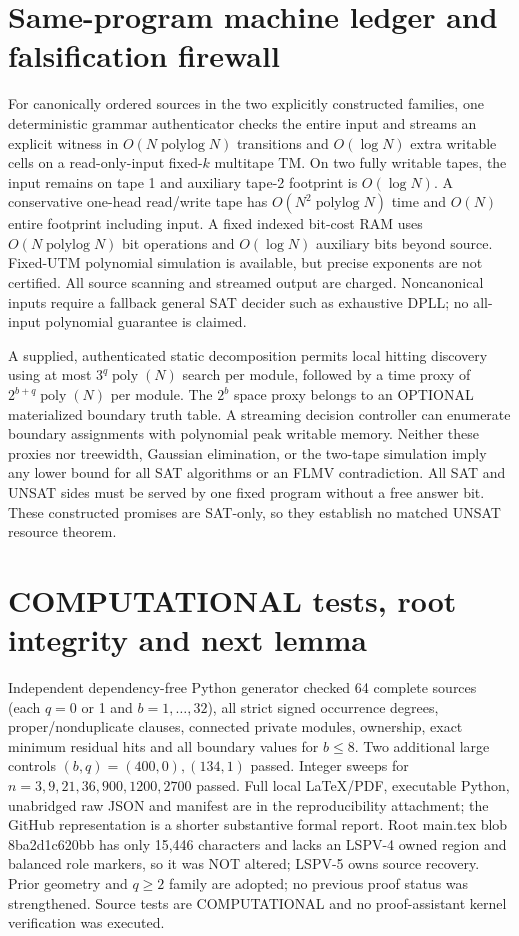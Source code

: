 \documentclass[11pt]{article}
\begin{document}
\section{Same-program machine ledger and falsification firewall}
For canonically ordered sources in the two explicitly constructed families, one deterministic grammar authenticator checks the entire input and streams an explicit witness in $O(N\operatorname{polylog}N)$ transitions and $O(\log N)$ extra writable cells on a read-only-input fixed-$k$ multitape TM. On two fully writable tapes, the input remains on tape 1 and auxiliary tape-2 footprint is $O(\log N)$. A conservative one-head read/write tape has $O(N^2\operatorname{polylog} N)$ time and $O(N)$ entire footprint including input. A fixed indexed bit-cost RAM uses $O(N\operatorname{polylog} N)$ bit operations and $O(\log N)$ auxiliary bits beyond source. Fixed-UTM polynomial simulation is available, but precise exponents are not certified. All source scanning and streamed output are charged. Noncanonical inputs require a fallback general SAT decider such as exhaustive DPLL; no all-input polynomial guarantee is claimed.

A supplied, authenticated static decomposition permits local hitting discovery using at most $3^q\operatorname{poly}(N)$ search per module, followed by a time proxy of $2^{b+q}\operatorname{poly}(N)$ per module. The $2^b$ space proxy belongs to an OPTIONAL materialized boundary truth table. A streaming decision controller can enumerate boundary assignments with polynomial peak writable memory. Neither these proxies nor treewidth, Gaussian elimination, or the two-tape simulation imply any lower bound for all SAT algorithms or an FLMV contradiction. All SAT and UNSAT sides must be served by one fixed program without a free answer bit. These constructed promises are SAT-only, so they establish no matched UNSAT resource theorem.

\section{COMPUTATIONAL tests, root integrity and next lemma}
Independent dependency-free Python generator checked 64 complete sources (each $q=0$ or 1 and $b=1,\dots,32$), all strict signed occurrence degrees, proper/nonduplicate clauses, connected private modules, ownership, exact minimum residual hits and all boundary values for $b\le8$. Two additional large controls $(b,q)=(400,0),(134,1)$ passed. Integer sweeps for $n=3,9,21,36,900,1200,2700$ passed. Full local LaTeX/PDF, executable Python, unabridged raw JSON and manifest are in the reproducibility attachment; the GitHub representation is a shorter substantive formal report.
Root main.tex blob 8ba2d1c620bb has only 15,446 characters and lacks an LSPV-4 owned region and balanced role markers, so it was NOT altered; LSPV-5 owns source recovery. Prior geometry and $q\ge2$ family are adopted; no previous proof status was strengthened. Source tests are COMPUTATIONAL and no proof-assistant kernel verification was executed.
\end{document}
